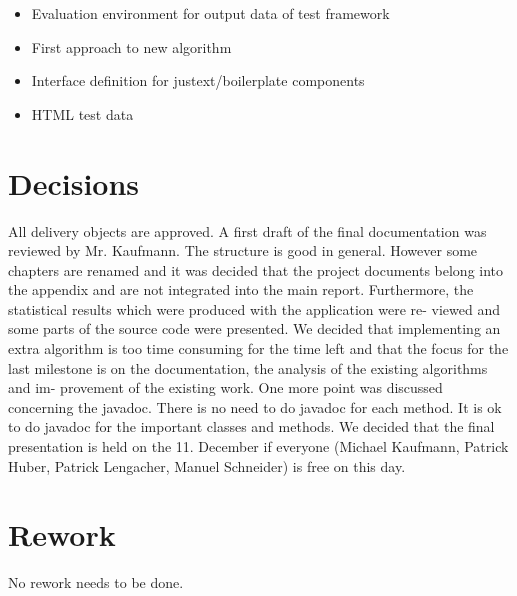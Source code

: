\begin{itemize}
\item Evaluation environment for output data of test framework

\item First approach to new algorithm

\item Interface definition for justext/boilerplate components
\item HTML test data
\end{itemize}


\section{Decisions}

All delivery objects are approved. A first draft of the final documentation was reviewed
by Mr. Kaufmann. The structure is good in general. However some chapters are
renamed and it was decided that the project documents belong into the appendix and
are not integrated into the main report.
Furthermore, the statistical results which were produced with the application were re-
viewed and some parts of the source code were presented. We decided that implementing
an extra algorithm is too time consuming for the time left and that the focus for the
last milestone is on the documentation, the analysis of the existing algorithms and im-
provement of the existing work.
One more point was discussed concerning the javadoc. There is no need to do javadoc
for each method. It is ok to do javadoc for the important classes and methods.
We decided that the final presentation is held on the 11. December if everyone (Michael
Kaufmann, Patrick Huber, Patrick Lengacher, Manuel Schneider) is free on this day.

\section{Rework}

No rework needs to be done.